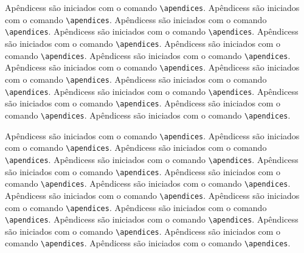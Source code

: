 Apêndicess são iniciados com o comando \verb|\apendices|.
Apêndicess são iniciados com o comando \verb|\apendices|.
Apêndicess são iniciados com o comando \verb|\apendices|.
Apêndicess são iniciados com o comando \verb|\apendices|.
Apêndicess são iniciados com o comando \verb|\apendices|.
Apêndicess são iniciados com o comando \verb|\apendices|.
Apêndicess são iniciados com o comando \verb|\apendices|.
Apêndicess são iniciados com o comando \verb|\apendices|.
Apêndicess são iniciados com o comando \verb|\apendices|.
Apêndicess são iniciados com o comando \verb|\apendices|.
Apêndicess são iniciados com o comando \verb|\apendices|.
Apêndicess são iniciados com o comando \verb|\apendices|.
Apêndicess são iniciados com o comando \verb|\apendices|.
Apêndicess são iniciados com o comando \verb|\apendices|.

Apêndicess são iniciados com o comando \verb|\apendices|.
Apêndicess são iniciados com o comando \verb|\apendices|.
Apêndicess são iniciados com o comando \verb|\apendices|.
Apêndicess são iniciados com o comando \verb|\apendices|.
Apêndicess são iniciados com o comando \verb|\apendices|.
Apêndicess são iniciados com o comando \verb|\apendices|.
Apêndicess são iniciados com o comando \verb|\apendices|.
Apêndicess são iniciados com o comando \verb|\apendices|.
Apêndicess são iniciados com o comando \verb|\apendices|.
Apêndicess são iniciados com o comando \verb|\apendices|.
Apêndicess são iniciados com o comando \verb|\apendices|.
Apêndicess são iniciados com o comando \verb|\apendices|.
Apêndicess são iniciados com o comando \verb|\apendices|.
Apêndicess são iniciados com o comando \verb|\apendices|.
